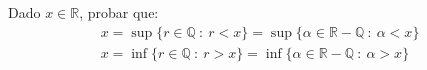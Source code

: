 \begin{ejercicio}
    Dado $x \in \mathbb{R}$, probar que:
    \begin{gather*}
        x=\sup \{r \in \mathbb{Q}~:~ r < x\}=\sup \{\alpha \in \mathbb{R}-\mathbb{Q}~:~ \alpha < x\} \\
        x=\inf \{r \in \mathbb{Q}~:~ r > x\}=\inf \{\alpha \in \mathbb{R}-\mathbb{Q}~:~ \alpha > x\}
    \end{gather*}
\end{ejercicio}